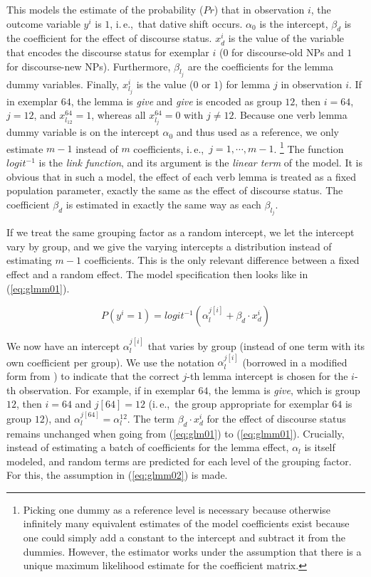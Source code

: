 \documentclass[a4paper,12pt]{article}
\newcommand{\ie}{i.\,e.,\ }
\begin{document}
This models the estimate of the probability ($Pr$) that in observation $i$, the outcome variable $y^i$ is $1$, \ie that dative shift occurs.
$\alpha_0$ is the intercept, $\beta_d$ is the coefficient for the effect of discourse status.
$x_d^i$ is the value of the variable that encodes the discourse status for exemplar $i$ ($0$ for discourse-old NPs and $1$ for discourse-new NPs).
Furthermore, $\beta_{l_j}$ are the coefficients for the lemma dummy variables.
Finally, $x_{l_j}^i$ is the value ($0$ or $1$) for lemma $j$ in observation $i$.
If in exemplar $64$, the lemma is \textit{give} and \textit{give} is encoded as group $12$, then $i=64$, $j=12$, and $x_{l_{12}}^{64}=1$, whereas all $x_{l_j}^{64}=0$ with $j\neq12$.
Because one verb lemma dummy variable is on the intercept $\alpha_0$ and thus used as a reference, we only estimate $m-1$ instead of $m$ coefficients, \ie $j=1,\cdots,m-1$.%
\footnote{Picking one dummy as a reference level is necessary because otherwise infinitely many equivalent estimates of the model coefficients exist because one could simply add a constant to the intercept and subtract it from the dummies.
However, the estimator works under the assumption that there is a unique maximum likelihood estimate for the coefficient matrix.}
The function $logit^{-1}$ is the \textit{link function}, and its argument is the \textit{linear term} of the model.
It is obvious that in such a model, the effect of each verb lemma is treated as a fixed population parameter, exactly the same as the effect of discourse status.
The coefficient $\beta_d$ is estimated in exactly the same way as each $\beta_{l_j}$.

If we treat the same grouping factor as a random intercept, we let the intercept vary by group, and we give the varying intercepts a distribution instead of estimating $m-1$ coefficients.
This is the only relevant difference between a fixed effect and a random effect.
The model specification then looks like in (\ref{eq:glmm01}).

\begin{equation}
  P(y^i=1)=logit^{-1}(\alpha_{l}^{j[i]}+\beta_d\cdot x_d^i)
  \label{eq:glmm01}
\end{equation}

We now have an intercept $\alpha_l^{j[i]}$ that varies by group (instead of one term with its own coefficient per group).
We use the notation $\alpha_l^{j[i]}$ (borrowed in a modified form from \citealt{GelmanHill2006}) to indicate that the correct $j$-th lemma intercept is chosen for the $i$-th observation.
For example, if in exemplar $64$, the lemma is \textit{give}, which is group $12$, then $i=64$ and $j[64]=12$ (\ie the group appropriate for exemplar $64$ is group $12$), and $\alpha_l^{j[64]}=\alpha_l^{12}$.
The term $\beta_d\cdot x_d^i$ for the effect of discourse status remains unchanged when going from (\ref{eq:glm01}) to (\ref{eq:glmm01}).
Crucially, instead of estimating a batch of coefficients for the lemma effect, $\alpha_l$ is itself modeled, and random terms are predicted for each level of the grouping factor.
For this, the assumption in (\ref{eq:glmm02}) is made.
\end{document}
